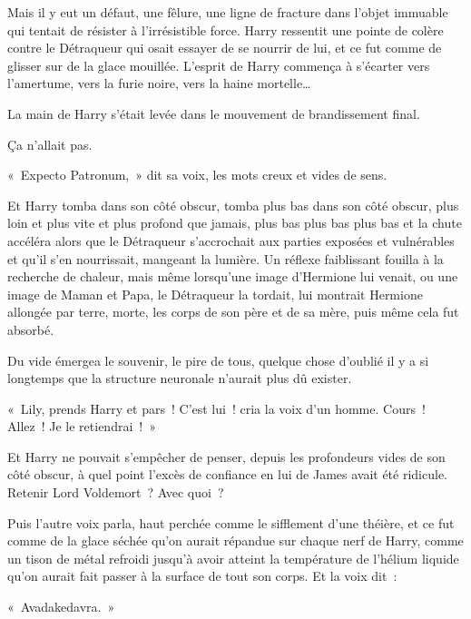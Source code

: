 Mais il y eut un défaut, une fêlure, une ligne de fracture dans l'objet immuable qui tentait de résister à l'irrésistible force. Harry ressentit une pointe de colère contre le Détraqueur qui osait essayer de se nourrir de lui, et ce fut comme de glisser sur de la glace mouillée. L'esprit de Harry commença à s'écarter vers l'amertume, vers la furie noire, vers la haine mortelle…

La main de Harry s'était levée dans le mouvement de brandissement final.

Ça n'allait pas.

«~Expecto Patronum,~» dit sa voix, les mots creux et vides de sens.

Et Harry tomba dans son côté obscur, tomba plus bas dans son côté obscur, plus loin et plus vite et plus profond que jamais, plus bas plus bas plus bas et la chute accéléra alors que le Détraqueur s'accrochait aux parties exposées et vulnérables et qu'il s'en nourrissait, mangeant la lumière. Un réflexe faiblissant fouilla à la recherche de chaleur, mais même lorsqu'une image d'Hermione lui venait, ou une image de Maman et Papa, le Détraqueur la tordait, lui montrait Hermione allongée par terre, morte, les corps de son père et de sa mère, puis même cela fut absorbé.

Du vide émergea le souvenir, le pire de tous, quelque chose d'oublié il y a si longtemps que la structure neuronale n'aurait plus dû exister.
\begin{em}
«~Lily, prends Harry et pars~! C'est lui~! cria la voix d'un homme. Cours~! Allez~! Je le retiendrai~!~»

Et Harry ne pouvait s'empêcher de penser, depuis les profondeurs vides de son côté obscur, à quel point l'excès de confiance en lui de James avait été ridicule. Retenir Lord Voldemort~? Avec quoi~?

Puis l'autre voix parla, haut perchée comme le sifflement d'une théière, et ce fut comme de la glace séchée qu'on aurait répandue sur chaque nerf de Harry, comme un tison de métal refroidi jusqu'à avoir atteint la température de l'hélium liquide qu'on aurait fait passer à la surface de tout son corps. Et la voix dit~:

«~Avadakedavra.~»
\end{em}

